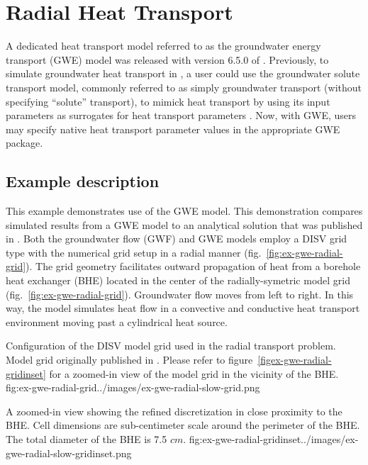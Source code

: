 \section{Radial Heat Transport}

A dedicated heat transport model referred to as the groundwater energy transport (GWE) model was released with version 6.5.0 of \mf. Previously, to simulate groundwater heat transport in \mf, a user could use the groundwater solute transport model, commonly referred to as simply groundwater transport (without specifying ``solute'' transport), to mimick heat transport by using its input parameters as surrogates for heat transport parameters \cite{ modflow6gwt, ma2010, langevin2008seawat}. Now, with GWE, users may specify native heat transport parameter values in the appropriate GWE package.

\subsection{Example description}

This example demonstrates use of the GWE model.  This demonstration compares simulated results from a GWE model to an analytical solution that was published in \citep{alKhoury2020}.  Both the groundwater flow (GWF) and GWE models employ a DISV grid type \cite{modflow6software} with the numerical grid setup in a radial manner (fig.~\ref{fig:ex-gwe-radial-grid}). The grid geometry facilitates outward propagation of heat from a borehole heat exchanger (BHE) \cite{hechtMendez2010} located in the center of the radially-symetric model grid (fig.~\ref{fig:ex-gwe-radial-grid}). Groundwater flow moves from left to right. In this way, the model simulates heat flow in a convective and conductive heat transport environment moving past a cylindrical heat source.
 
\begin{StandardFigure}{
                                     Configuration of the DISV model grid used in the radial transport problem.  Model grid originally published in \citep{alKhoury2020}.  Please refer to figure~\ref{figex-gwe-radial-gridinset} for a zoomed-in view of the model grid in the vicinity of the BHE.
                                     }{fig:ex-gwe-radial-grid}{../images/ex-gwe-radial-slow-grid.png}
\end{StandardFigure}            

\begin{StandardFigure}{
                                     A zoomed-in view showing the refined discretization in close proximity to the BHE.  Cell dimensions are sub-centimeter scale around the perimeter of the BHE.  The total diameter of the BHE is 7.5 $cm$.
                                     }{fig:ex-gwe-radial-gridinset}{../images/ex-gwe-radial-slow-gridinset.png}
\end{StandardFigure}            

